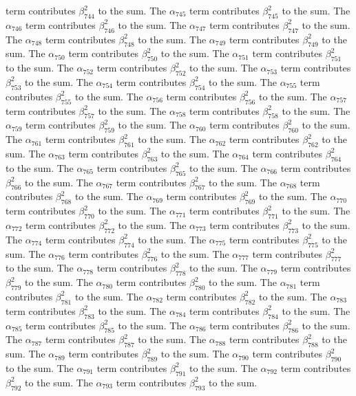 \begin{lemma}
term contributes $\beta_{744}^{2}$ to the sum. The $\alpha_{745}$ term contributes $\beta_{745}^{2}$ to the sum. The $\alpha_{746}$ term contributes $\beta_{746}^{2}$ to the sum. The $\alpha_{747}$ term contributes $\beta_{747}^{2}$ to the sum. The $\alpha_{748}$ term contributes $\beta_{748}^{2}$ to the sum. The $\alpha_{749}$ term contributes $\beta_{749}^{2}$ to the sum. The $\alpha_{750}$ term contributes $\beta_{750}^{2}$ to the sum. The $\alpha_{751}$ term contributes $\beta_{751}^{2}$ to the sum. The $\alpha_{752}$ term contributes $\beta_{752}^{2}$ to the sum. The $\alpha_{753}$ term contributes $\beta_{753}^{2}$ to the sum. The $\alpha_{754}$ term contributes $\beta_{754}^{2}$ to the sum. The $\alpha_{755}$ term contributes $\beta_{755}^{2}$ to the sum. The $\alpha_{756}$ term contributes $\beta_{756}^{2}$ to the sum. The $\alpha_{757}$ term contributes $\beta_{757}^{2}$ to the sum. The $\alpha_{758}$ term contributes $\beta_{758}^{2}$ to the sum. The $\alpha_{759}$ term contributes $\beta_{759}^{2}$ to the sum. The $\alpha_{760}$ term contributes $\beta_{760}^{2}$ to the sum. The $\alpha_{761}$ term contributes $\beta_{761}^{2}$ to the sum. The $\alpha_{762}$ term contributes $\beta_{762}^{2}$ to the sum. The $\alpha_{763}$ term contributes $\beta_{763}^{2}$ to the sum. The $\alpha_{764}$ term contributes $\beta_{764}^{2}$ to the sum. The $\alpha_{765}$ term contributes $\beta_{765}^{2}$ to the sum. The $\alpha_{766}$ term contributes $\beta_{766}^{2}$ to the sum. The $\alpha_{767}$ term contributes $\beta_{767}^{2}$ to the sum. The $\alpha_{768}$ term contributes $\beta_{768}^{2}$ to the sum. The $\alpha_{769}$ term contributes $\beta_{769}^{2}$ to the sum. The $\alpha_{770}$ term contributes $\beta_{770}^{2}$ to the sum. The $\alpha_{771}$ term contributes $\beta_{771}^{2}$ to the sum. The $\alpha_{772}$ term contributes $\beta_{772}^{2}$ to the sum. The $\alpha_{773}$ term contributes $\beta_{773}^{2}$ to the sum. The $\alpha_{774}$ term contributes $\beta_{774}^{2}$ to the sum. The $\alpha_{775}$ term contributes $\beta_{775}^{2}$ to the sum. The $\alpha_{776}$ term contributes $\beta_{776}^{2}$ to the sum. The $\alpha_{777}$ term contributes $\beta_{777}^{2}$ to the sum. The $\alpha_{778}$ term contributes $\beta_{778}^{2}$ to the sum. The $\alpha_{779}$ term contributes $\beta_{779}^{2}$ to the sum. The $\alpha_{780}$ term contributes $\beta_{780}^{2}$ to the sum. The $\alpha_{781}$ term contributes $\beta_{781}^{2}$ to the sum. The $\alpha_{782}$ term contributes $\beta_{782}^{2}$ to the sum. The $\alpha_{783}$ term contributes $\beta_{783}^{2}$ to the sum. The $\alpha_{784}$ term contributes $\beta_{784}^{2}$ to the sum. The $\alpha_{785}$ term contributes $\beta_{785}^{2}$ to the sum. The $\alpha_{786}$ term contributes $\beta_{786}^{2}$ to the sum. The $\alpha_{787}$ term contributes $\beta_{787}^{2}$ to the sum. The $\alpha_{788}$ term contributes $\beta_{788}^{2}$ to the sum. The $\alpha_{789}$ term contributes $\beta_{789}^{2}$ to the sum. The $\alpha_{790}$ term contributes $\beta_{790}^{2}$ to the sum. The $\alpha_{791}$ term contributes $\beta_{791}^{2}$ to the sum. The $\alpha_{792}$ term contributes $\beta_{792}^{2}$ to the sum. The $\alpha_{793}$ term contributes $\beta_{793}^{2}$ to the sum. 
\end{lemma}
